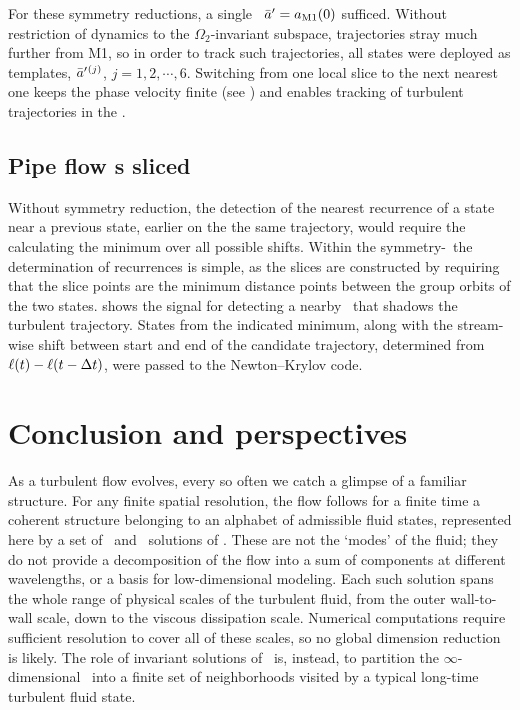\documentclass{jfm}
\begin{document}
For these symmetry reductions, a single \template\
$\bar{a}' = a_{\mathrm{M1}}(0)$ sufficed.
Without restriction of dynamics to the $\Omega_2$-invariant subspace,
trajectories stray much further from M1, so in order to track
such trajectories, all {\reqva}
states were deployed as templates,  $\bar{a}'{}^{(j)}$, $j=1,2,\cdots,6$.
Switching from one local slice to the next nearest one keeps the phase
velocity \refeq{reconstrEq} finite (see \reffig{fig:thetadot}) and
enables tracking of turbulent trajectories in the \reducedsp.


\subsection{Pipe flow \rpo s sliced}
\label{s:rpos}

 Without symmetry reduction, the detection
of the nearest recurrence of a state near a previous state, earlier on the
the same trajectory,
would require the calculating the minimum over all possible shifts.
Within the symmetry-\reducedsp\ the determination of recurrences is simple,
as the slices are constructed by requiring that the slice points are
the minimum distance points between the group orbits of the two states.
\refFig{fig:NormDiff} shows the signal for detecting a nearby \rpo\
that shadows the turbulent trajectory.  States from the indicated minimum,
along with the stream-wise shift between start and end of the candidate trajectory,
determined from $\ell(t)-\ell(t-\Delta t)$,
were passed to the Newton--Krylov code.


\section{Conclusion and perspectives}
\label{s:concl}

As a turbulent flow evolves, every so often we catch a glimpse of a
familiar structure. For any finite spatial resolution, the flow
follows for a finite time a coherent structure belonging to an
alphabet of admissible fluid states, represented here by a set of \reqv\
and \rpo\ solutions of \NS. These are not the `modes' of the fluid; {they
do not provide a decomposition of the flow into a sum of components at
different wavelengths, or a basis for low-dimensional
modeling.} Each such solution spans the whole range of physical scales of
the turbulent fluid, from the outer wall-to-wall scale, down to the
viscous dissipation scale. Numerical computations require sufficient
resolution to cover all of these scales, so no {global} dimension
reduction is likely. The role of invariant solutions of \NS\ is, instead,
to partition the $\infty$-dimensional \statesp\ into a finite set of
neighborhoods visited by a typical long-time turbulent fluid state.
\end{document}
